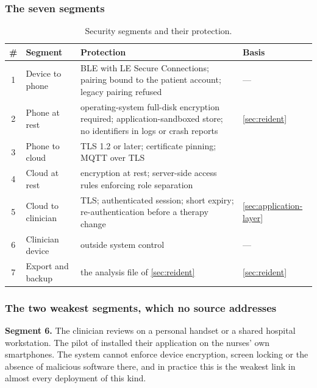 \documentclass[12pt,a4paper,oneside]{report}
\begin{document}
\subsubsection{The seven segments}

\begin{table}[htbp]
\centering\footnotesize
\caption{Security segments and their protection.}\label{tab:security-segments}
\begin{tabularx}{\textwidth}{@{}c >{\raggedright\arraybackslash}p{2.6cm} X >{\raggedright\arraybackslash}p{2.6cm}@{}}
\toprule
\textbf{\#} & \textbf{Segment} & \textbf{Protection} & \textbf{Basis} \\
\midrule
1 & Device to phone & BLE with LE Secure Connections; pairing bound to the patient account; legacy pairing refused & --- \\
2 & Phone at rest & operating-system full-disk encryption required; application-sandboxed store; no identifiers in logs or crash reports & \cref{sec:reident} \\
3 & Phone to cloud & TLS 1.2 or later; certificate pinning; MQTT over TLS & \textcite{efendi2025} \\
4 & Cloud at rest & encryption at rest; server-side access rules enforcing role separation & \textcite{efendi2025,liu2025review} \\
5 & Cloud to clinician & TLS; authenticated session; short expiry; re-authentication before a therapy change & \cref{sec:application-layer} \\
6 & Clinician device & outside system control & --- \\
7 & Export and backup & the analysis file of \cref{sec:reident} & \cref{sec:reident} \\
\bottomrule
\end{tabularx}
\end{table}

\subsubsection{The two weakest segments, which no source addresses}

\textbf{Segment 6.} The clinician reviews on a personal handset or a shared hospital workstation. The pilot of \textcite{mucchi2021} installed their application on the nurses' own smartphones. The system cannot enforce device encryption, screen locking or the absence of malicious software there, and in practice this is the weakest link in almost every deployment of this kind.
\end{document}
